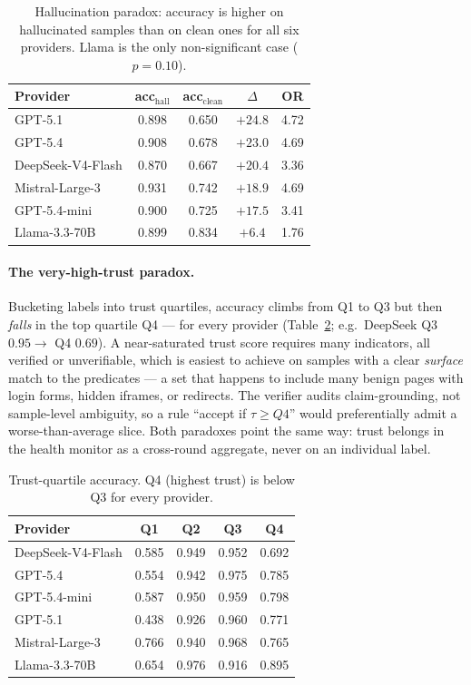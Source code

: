 \begin{table}[h]
\centering
\caption{Hallucination paradox: accuracy is higher on hallucinated samples than on
clean ones for all six providers. Llama is the only non-significant case
($p=0.10$).}
\label{tab:bench-halluc}
\small
\begin{tabular}{@{}lcccc@{}}
\toprule
Provider & acc$_{\text{hall}}$ & acc$_{\text{clean}}$ & $\Delta$ & OR \\
\midrule
GPT-5.1           & 0.898 & 0.650 & $+24.8$ & 4.72 \\
GPT-5.4           & 0.908 & 0.678 & $+23.0$ & 4.69 \\
DeepSeek-V4-Flash & 0.870 & 0.667 & $+20.4$ & 3.36 \\
Mistral-Large-3   & 0.931 & 0.742 & $+18.9$ & 4.69 \\
GPT-5.4-mini      & 0.900 & 0.725 & $+17.5$ & 3.41 \\
Llama-3.3-70B     & 0.899 & 0.834 & $+6.4$  & 1.76 \\
\bottomrule
\end{tabular}
\end{table}

\paragraph{The very-high-trust paradox.} Bucketing labels into trust quartiles,
accuracy climbs from Q1 to Q3 but then \emph{falls} in the top quartile Q4 --- for
every provider (Table~\ref{tab:bench-trust}; e.g.\ DeepSeek Q3 $0.95\!\to$ Q4
$0.69$). A near-saturated trust score requires many indicators, all verified or
unverifiable, which is easiest to achieve on samples with a clear \emph{surface}
match to the predicates --- a set that happens to include many benign pages with
login forms, hidden iframes, or redirects. The verifier audits claim-grounding,
not sample-level ambiguity, so a rule ``accept if $\tau\geq Q4$'' would
preferentially admit a worse-than-average slice. Both paradoxes point the same
way: trust belongs in the health monitor as a cross-round aggregate, never on an
individual label.

\begin{table}[h]
\centering
\caption{Trust-quartile accuracy. Q4 (highest trust) is below Q3 for every
provider.}
\label{tab:bench-trust}
\small
\begin{tabular}{@{}lcccc@{}}
\toprule
Provider & Q1 & Q2 & Q3 & Q4 \\
\midrule
DeepSeek-V4-Flash & 0.585 & 0.949 & 0.952 & 0.692 \\
GPT-5.4           & 0.554 & 0.942 & 0.975 & 0.785 \\
GPT-5.4-mini      & 0.587 & 0.950 & 0.959 & 0.798 \\
GPT-5.1           & 0.438 & 0.926 & 0.960 & 0.771 \\
Mistral-Large-3   & 0.766 & 0.940 & 0.968 & 0.765 \\
Llama-3.3-70B     & 0.654 & 0.976 & 0.916 & 0.895 \\
\bottomrule
\end{tabular}
\end{table}

